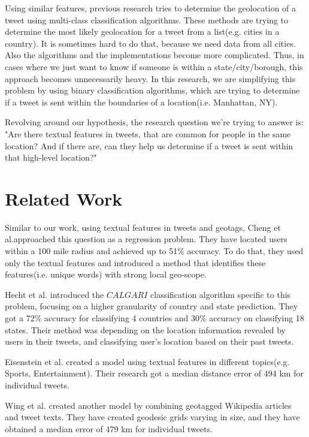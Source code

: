 \documentclass[twoside,11pt]{article}
\begin{document}
Using similar features, previous research tries to determine the geolocation of a tweet using multi-class classification algorithms. These methods are trying to determine the most likely geolocation for a tweet from a list(e.g. cities in a country). It is sometimes hard to do that, because we need data from all cities. Also the algorithms and the implementations become more complicated. Thus, in cases where we just want to know if someone is within a state/city/borough, this approach becomes unnecessarily heavy. In this research, we are simplifying this problem by using binary classification algorithms, which are trying to determine if a tweet is sent within the boundaries of a location(i.e. Manhattan, NY). 

Revolving around our hypothesis, the research question we're trying to answer is: "Are there textual features in tweets, that are common for people in the same location? And if there are, can they help us determine if a tweet is sent within that high-level location?"

\section{Related Work}

Similar to our work, using textual features in tweets and geotags, Cheng et al.approached this question as a regression problem\cite{cheng2010you}. They have located users within a 100 mile radius and achieved up to 51\% accuracy. To do that, they used only the textual features and introduced a method that identifies these features(i.e. unique words) with strong local geo-scope.

Hecht et al. introduced the $CALGARI$ classification algorithm specific to this problem, focusing on a higher granularity of country and state prediction\cite{hecht2011tweets}. They got a 72\% accuracy for classifying 4 countries and 30\% accuracy on classifying 18 states. Their method was depending on the location information revealed by users in their tweets, and classifying user's location based on their past tweets.

Eisenstein et al. created a model using textual features in different topics(e.g. Sports, Entertainment)\cite{eisenstein2010latent}. Their research got a median distance error of 494 km for individual tweets.

Wing et al. created another model by combining geotagged Wikipedia articles and tweet texts\cite{wing2011simple}. They have created geodesic grids varying in size, and they have obtained a median error of 479 km for individual tweets. 
\end{document}

